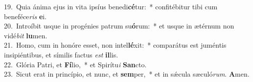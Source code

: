 {19.~}Quia ánima ejus in vita ipsíus benedi\textbf{cé}tur:~* confitébitur tibi cum beneféce\textit{ris} \textbf{e}i.\\
{20.~}Introíbit usque in progénies patrum su\textbf{ó}rum:~* et usque in ætérnum non vidé\textit{bit} \textbf{lu}men.\\
{21.~}Homo, cum in honóre esset, non intel\textbf{lé}xit:~* comparátus est juméntis insipiéntibus, et símilis factus \textit{est} \textbf{il}lis.\\
{22.~}Glória Patri, et \textbf{Fí}lio,~* et Spirítu\textit{i} \textbf{San}cto.\\
{23.~}Sicut erat in princípio, et nunc, et \textbf{sem}per,~* et in sǽcula sæculó\textit{rum}. \textbf{A}men.\\
